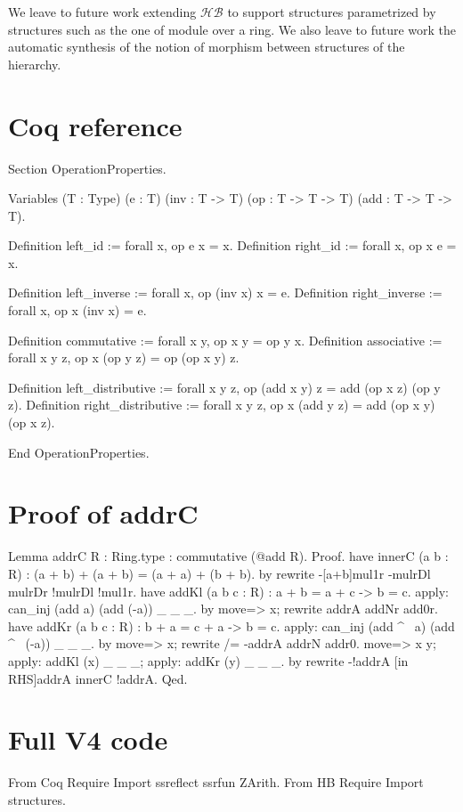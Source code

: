 \documentclass[a4paper,UKenglish,cleveref, autoref]{lipics-v2019}
\newcommand{\HB}{\ensuremath{\mathcal{HB}}}
\theoremstyle{implem}
\theoremstyle{implem}
\theoremstyle{command}
\theoremstyle{commands}
\begin{document}
{{We leave to future work extending \HB{} to support structures parametrized
by structures such as the one of module over a ring.
We also leave to future
work the automatic synthesis of the notion of morphism between structures
of the hierarchy.


\newpage
\appendix

\section{Coq reference}
\label{sec:coq-reference}
\begin{coqcode}
Section OperationProperties.

Variables (T : Type) (e : T) (inv : T -> T) (op : T -> T -> T) (add : T -> T -> T).

Definition left_id  := forall x, op e x = x.
Definition right_id := forall x, op x e = x.

Definition left_inverse := forall x, op (inv x) x = e.
Definition right_inverse := forall x, op x (inv x) = e.

Definition commutative := forall x y, op x y = op y x.
Definition associative := forall x y z, op x (op y z) = op (op x y) z.

Definition left_distributive  := forall x y z, op (add x y) z = add (op x z) (op y z).
Definition right_distributive := forall x y z, op x (add y z) = add (op x y) (op x z).

End OperationProperties.
\end{coqcode}

\section{Proof of addrC}
\label{sec:proof-addrc}
\begin{coqcode}
Lemma addrC {R : Ring.type} : commutative (@add R).
Proof.
have innerC (a b : R) : (a + b) + (a + b) = (a + a) + (b + b).
  by rewrite -[a+b]mul1r -mulrDl mulrDr !mulrDl !mul1r.
have addKl (a b c : R) : a + b = a + c -> b = c.
  apply: can_inj (add a) (add (-a)) _ _ _.
  by move=> x; rewrite addrA addNr add0r.
have addKr (a b c : R) : b + a = c + a -> b = c.
  apply: can_inj (add ^~ a) (add ^~ (-a)) _ _ _.
  by move=> x; rewrite /= -addrA addrN addr0.
move=> x y; apply: addKl (x) _ _ _; apply: addKr (y) _ _ _.
by rewrite -!addrA [in RHS]addrA innerC !addrA.
Qed.
\end{coqcode}

\section{Full V4 code}
\label{sec:full-v4-code}
\begin{coqcode}
From Coq Require Import ssreflect ssrfun ZArith.
From HB Require Import structures.


\end{coqcode}}}
\end{document}
